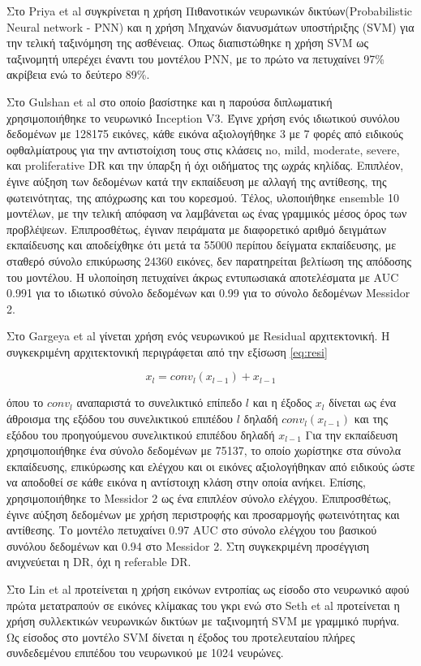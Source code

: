 Στο Priya et al \cite{Priya} συγκρίνεται η χρήση Πιθανοτικών νευρωνικών δικτύων(Probabilistic Neural network - PNN) και η χρήση Μηχανών διανυσμάτων υποστήριξης (SVM) για την τελική ταξινόμηση της ασθένειας. Όπως διαπιστώθηκε η χρήση SVM ως ταξινομητή υπερέχει έναντι του μοντέλου PNN, με το πρώτο να πετυχαίνει 97\% ακρίβεια ενώ το δεύτερο 89\%. 


Στο Gulshan et al \cite{Gulshan} στο οποίο βασίστηκε και η παρούσα διπλωματική χρησιμοποιήθηκε το νευρωνικό Inception V3. Έγινε χρήση ενός ιδιωτικού συνόλου δεδομένων με 128175 εικόνες, κάθε εικόνα  αξιολογήθηκε 3 με 7 φορές από ειδικούς οφθαλμίατρους για την αντιστοίχιση τους στις κλάσεις no, mild, moderate, severe, και proliferative DR και την ύπαρξη ή όχι οιδήματος της ωχράς κηλίδας. Επιπλέον, έγινε αύξηση των δεδομένων κατά την εκπαίδευση με αλλαγή της αντίθεσης, της φωτεινότητας, της απόχρωσης και του κορεσμού. Τέλος, υλοποιήθηκε ensemble 10 μοντέλων, με την τελική απόφαση να λαμβάνεται ως  ένας γραμμικός μέσος όρος των προβλέψεων. Επιπροσθέτως, έγιναν πειράματα με διαφορετικό αριθμό δειγμάτων εκπαίδευσης και αποδείχθηκε ότι μετά τα 55000 περίπου δείγματα εκπαίδευσης, με σταθερό σύνολο επικύρωσης 24360 εικόνες, δεν παρατηρείται βελτίωση της απόδοσης του μοντέλου. Η υλοποίηση πετυχαίνει άκρως εντυπωσιακά αποτελέσματα με AUC 0.991 για το ιδιωτικό σύνολο δεδομένων και 0.99 για το σύνολο δεδομένων Messidor 2.

Στο  Gargeya et al \cite{Gargeya} γίνεται χρήση ενός νευρωνικού με Residual αρχιτεκτονική. Η συγκεκριμένη αρχιτεκτονική περιγράφεται από την εξίσωση \ref{eq:resi}

\begin{equation} \label{eq:resi}
x_{l} = conv_{l}(x_{l-1}) + x_{l-1}
\end{equation}

όπου το $conv_{l}$ αναπαριστά το συνελικτικό επίπεδο $l$ και η έξοδος $x_{l}$ δίνεται ως ένα άθροισμα της εξόδου του συνελικτικού επιπέδου $l$ δηλαδή $conv_{l}(x_{l-1})$ και της εξόδου του προηγούμενου συνελικτικού επιπέδου δηλαδή $x_{l-1}$
Για την εκπαίδευση χρησιμοποιήθηκε ένα σύνολο δεδομένων με 75137, το οποίο χωρίστηκε στα σύνολα εκπαίδευσης, επικύρωσης και ελέγχου και οι εικόνες αξιολογήθηκαν από ειδικούς ώστε να αποδοθεί σε κάθε εικόνα η αντίστοιχη κλάση στην οποία ανήκει. Επίσης, χρησιμοποιήθηκε το Messidor 2 ως ένα επιπλέον σύνολο ελέγχου. Επιπροσθέτως, έγινε αύξηση δεδομένων με χρήση περιστροφής και προσαρμογής φωτεινότητας και αντίθεσης. Το μοντέλο πετυχαίνει 0.97 AUC στο σύνολο ελέγχου του βασικού συνόλου δεδομένων  και 0.94 στο Messidor 2. Στη συγκεκριμένη προσέγγιση ανιχνεύεται η DR, όχι η referable DR.


Στο Lin et al\cite{Lin} προτείνεται η χρήση εικόνων εντροπίας ως είσοδο στο νευρωνικό αφού πρώτα μετατραπούν σε εικόνες κλίμακας του γκρι ενώ στο Seth et al \cite{Seth} προτείνεται η χρήση συλλεκτικών νευρωνικών δικτύων με ταξινομητή SVM με γραμμικό πυρήνα. Ως είσοδος στο μοντέλο SVM δίνεται η έξοδος του προτελευταίου πλήρες συνδεδεμένου επιπέδου του νευρωνικού με 1024 νευρώνες.

